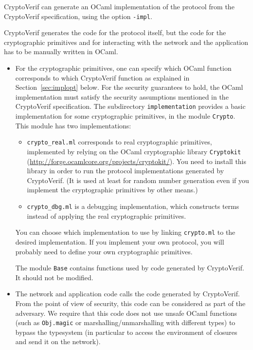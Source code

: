 CryptoVerif can generate an OCaml implementation of the protocol
from the CryptoVerif specification, using the option \texttt{-impl}.

CryptoVerif generates the code for the protocol itself, but the code
for the cryptographic primitives and for interacting with the network
and the application has to be manually written in OCaml. 
\begin{itemize}

\item For the cryptographic primitives, one can specify which OCaml 
function corresponds to which CryptoVerif function as explained in
Section~\ref{sec:implopt} below. For the security guarantees to hold, the OCaml
implementation must satisfy the security assumptions mentioned
in the CryptoVerif specification. The subdirectory \texttt{implementation}
provides a basic implementation for some cryptographic primitives,
in the module \texttt{Crypto}. This module has two implementations:
\begin{itemize}

\item \texttt{crypto\_real.ml} corresponds to real cryptographic primitives,
implemented by relying on the OCaml cryptographic library \texttt{Cryptokit}
(\url{http://forge.ocamlcore.org/projects/cryptokit/}). You need to
install this library in order to run the protocol implementations
generated by CryptoVerif. (It is used at least for random number generation
even if you implement the cryptographic primitives by other means.)

\item \texttt{crypto\_dbg.ml} is a debugging implementation, which 
constructs terms instead of applying the real cryptographic primitives.

\end{itemize}
You can choose which implementation to use by linking \texttt{crypto.ml}
to the desired implementation. If you implement your own protocol,
you will probably need to define your own cryptographic primitives.

The module \texttt{Base} contains functions used by code
generated by CryptoVerif. It should not be modified.

\item The network and application code calls the code generated
by CryptoVerif. From the point of view of security, this code can
be considered as part of the adversary. We require that this code
does not use unsafe OCaml functions (such as \texttt{Obj.magic}
or marshalling/unmarshalling with different types) to bypass the
typesystem (in particular to access the environment of closures
and send it on the network).


\end{itemize}
